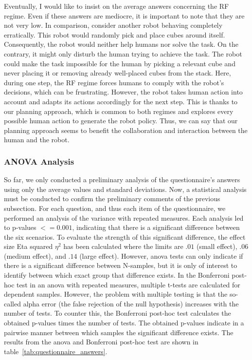 Eventually, I would like to insist on the average answers concerning the RF regime. Even if these answers are mediocre, it is important to note that they are not very low. In comparison, consider another robot behaving completely erratically. This robot would randomly pick and place cubes around itself. Consequently, the robot would neither help humans nor solve the task. On the contrary, it might only disturb the human trying to achieve the task. The robot could make the task impossible for the human by picking a relevant cube and never placing it or removing already well-placed cubes from the stack. Here, during one step, the RF regime forces humans to comply with the robot's decisions, which can be frustrating. However, the robot takes human action into account and adapts its actions accordingly for the next step. This is thanks to our planning approach, which is common to both regimes and explores every possible human action to generate the robot policy. Thus, we can say that our planning approach seems to benefit the collaboration and interaction between the human and the robot.

\subsubsection{ANOVA Analysis}

So far, we only conducted a preliminary analysis of the questionnaire's answers using only the average values and standard deviations. Now, a statistical analysis must be conducted to confirm the preliminary comments of the previous subsection. For each question, and thus each item of the questionnaire, we performed an analysis of the variance with repeated measures. Each analysis led to p-values $<=0.001$, indicating that there is a significant difference between the six scenarios. To evaluate the strength of this significant difference, the effect size Eta squared $\eta^2$ has been calculated where the limits are $.01$ (small effect), $.06$ (medium effect), and $.14$ (large effect). However, \acrshort{anova} tests can only indicate if there is a significant difference between N-samples, but it is only of interest to identify between which exact group that difference exists.  In the Bonferroni post-hoc test in an \acrshort{anova} with repeated measures, multiple t-tests are calculated for dependent samples. However, the problem with multiple testing is that the so-called alpha error (the false rejection of the null hypothesis) increases with the number of tests. To counter this, the Bonferroni post-hoc test calculates the obtained p-values times the number of tests. The obtained p-values indicate in a pairwise manner between which samples the significant difference exists. The results from the \acrshort{anova} and Bonferroni post-hoc test are shown in table~\ref{tab:questionnaire_answers}.

